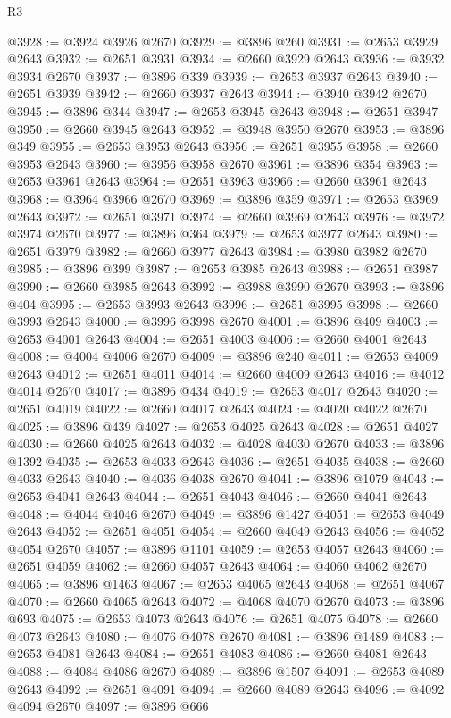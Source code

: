 \begin{lexlean}{R3}
\begin{coremodule}
@3928 := @3924 @3926 @2670
@3929 := @3896 @260
@3931 := @2653 @3929 @2643
@3932 := @2651 @3931
@3934 := @2660 @3929 @2643
@3936 := @3932 @3934 @2670
@3937 := @3896 @339
@3939 := @2653 @3937 @2643
@3940 := @2651 @3939
@3942 := @2660 @3937 @2643
@3944 := @3940 @3942 @2670
@3945 := @3896 @344
@3947 := @2653 @3945 @2643
@3948 := @2651 @3947
@3950 := @2660 @3945 @2643
@3952 := @3948 @3950 @2670
@3953 := @3896 @349
@3955 := @2653 @3953 @2643
@3956 := @2651 @3955
@3958 := @2660 @3953 @2643
@3960 := @3956 @3958 @2670
@3961 := @3896 @354
@3963 := @2653 @3961 @2643
@3964 := @2651 @3963
@3966 := @2660 @3961 @2643
@3968 := @3964 @3966 @2670
@3969 := @3896 @359
@3971 := @2653 @3969 @2643
@3972 := @2651 @3971
@3974 := @2660 @3969 @2643
@3976 := @3972 @3974 @2670
@3977 := @3896 @364
@3979 := @2653 @3977 @2643
@3980 := @2651 @3979
@3982 := @2660 @3977 @2643
@3984 := @3980 @3982 @2670
@3985 := @3896 @399
@3987 := @2653 @3985 @2643
@3988 := @2651 @3987
@3990 := @2660 @3985 @2643
@3992 := @3988 @3990 @2670
@3993 := @3896 @404
@3995 := @2653 @3993 @2643
@3996 := @2651 @3995
@3998 := @2660 @3993 @2643
@4000 := @3996 @3998 @2670
@4001 := @3896 @409
@4003 := @2653 @4001 @2643
@4004 := @2651 @4003
@4006 := @2660 @4001 @2643
@4008 := @4004 @4006 @2670
@4009 := @3896 @240
@4011 := @2653 @4009 @2643
@4012 := @2651 @4011
@4014 := @2660 @4009 @2643
@4016 := @4012 @4014 @2670
@4017 := @3896 @434
@4019 := @2653 @4017 @2643
@4020 := @2651 @4019
@4022 := @2660 @4017 @2643
@4024 := @4020 @4022 @2670
@4025 := @3896 @439
@4027 := @2653 @4025 @2643
@4028 := @2651 @4027
@4030 := @2660 @4025 @2643
@4032 := @4028 @4030 @2670
@4033 := @3896 @1392
@4035 := @2653 @4033 @2643
@4036 := @2651 @4035
@4038 := @2660 @4033 @2643
@4040 := @4036 @4038 @2670
@4041 := @3896 @1079
@4043 := @2653 @4041 @2643
@4044 := @2651 @4043
@4046 := @2660 @4041 @2643
@4048 := @4044 @4046 @2670
@4049 := @3896 @1427
@4051 := @2653 @4049 @2643
@4052 := @2651 @4051
@4054 := @2660 @4049 @2643
@4056 := @4052 @4054 @2670
@4057 := @3896 @1101
@4059 := @2653 @4057 @2643
@4060 := @2651 @4059
@4062 := @2660 @4057 @2643
@4064 := @4060 @4062 @2670
@4065 := @3896 @1463
@4067 := @2653 @4065 @2643
@4068 := @2651 @4067
@4070 := @2660 @4065 @2643
@4072 := @4068 @4070 @2670
@4073 := @3896 @693
@4075 := @2653 @4073 @2643
@4076 := @2651 @4075
@4078 := @2660 @4073 @2643
@4080 := @4076 @4078 @2670
@4081 := @3896 @1489
@4083 := @2653 @4081 @2643
@4084 := @2651 @4083
@4086 := @2660 @4081 @2643
@4088 := @4084 @4086 @2670
@4089 := @3896 @1507
@4091 := @2653 @4089 @2643
@4092 := @2651 @4091
@4094 := @2660 @4089 @2643
@4096 := @4092 @4094 @2670
@4097 := @3896 @666

\end{coremodule}
\end{lexlean}
